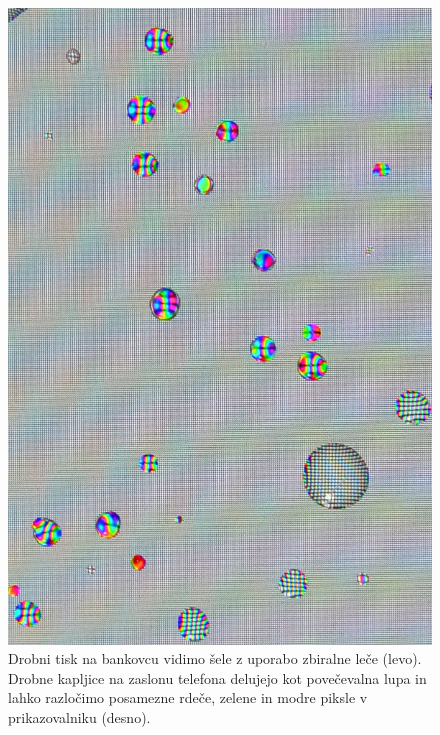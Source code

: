 \begin{figure}[htp]
\includegraphics[width=7truecm]{slike/02_photos_kapljice.jpg}
\caption{Drobni tisk na bankovcu vidimo šele z uporabo zbiralne leče (levo). 
Drobne kapljice na zaslonu telefona delujejo kot povečevalna lupa in lahko 
razločimo posamezne rdeče, zelene in modre piksle v prikazovalniku (desno).}
\label{fig:02_photos-1}
\end{figure}

